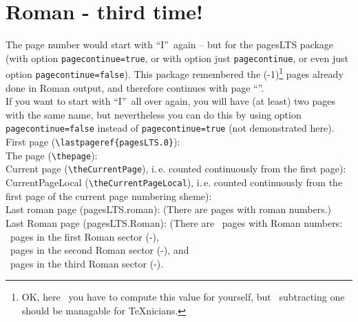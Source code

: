 \documentclass[british]{article}
\def\pagesLTSexamplealph{23}
\begin{document}
\addtocounter{page}{\pagesLTSexamplealph}

\bigskip

\lipsum[1-18]

\newpage


\section{Roman - third time!\label{Roman3}}

The page number would start with
\textquotedblleft I\textquotedblright\ again -- but
for the \textsf{pagesLTS} package (with option \texttt{pagecontinue=true},
or with option just \texttt{pagecontinue}, or even just
 option \texttt{pagecontinue=false}).
This package remembered the
(-1)\footnote{OK, here\ %
you have to compute this value for yourself, but\ %
subtracting one should be managable for \TeX nicians.} pages already
done in Roman output, and therefore continues with page
\textquotedblleft \thepage \textquotedblright .\\
If you want to start with \textquotedblleft I\textquotedblright\ all
over again, you will have (at least) two pages with the same name,
but nevertheless you can do this by using option
\texttt{pagecontinue=false} instead of \texttt{pagecontinue=true}
(not demonstrated here).\\

\noindent First page (\texttt{\textbackslash lastpageref\{pagesLTS.0\}}):
 \\

\noindent The page (\texttt{\textbackslash thepage}): \thepage \\

\noindent Current page (\texttt{\textbackslash theCurrentPage}),
i.\,e. counted continuously from the first page): \theCurrentPage \\

\noindent CurrentPageLocal (\texttt{\textbackslash theCurrentPageLocal}),
i.\,e. counted continuously from the first page of the
current page numbering sheme): \theCurrentPageLocal \\

\noindent Last roman page (pagesLTS.roman): 
(There are  pages with roman numbers.)\\

\noindent Last Roman page (pagesLTS.Roman): 
(There are ~pages with Roman numbers:\\
~pages in the first Roman sector
(\pageref{Roman}{\hskip3em }-),\\
~pages in the second Roman sector
(\pageref{Roman2}{\hskip3em }-), and\\
~pages in the third Roman sector
(\pageref{Roman3}{\hskip3em }-).\\
\end{document}
